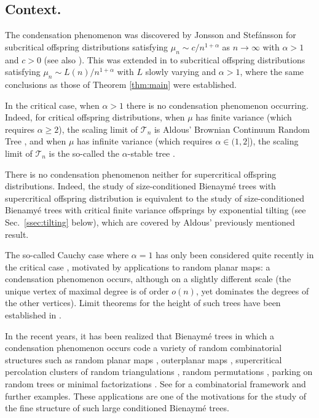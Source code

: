 \documentclass[a4paper,11pt]{article}
\begin{document}
        
        
            \subsection{Context.}
The condensation phenomenon was  discovered by Jonsson and Stefánsson \cite{Jonsson_Stefansson_2011} for subcritical offspring distributions satisfying  $\mu_n \sim c/n^{1+\alpha}$ as $n\rightarrow \infty$ with $\alpha>1$ and $c>0$ (see also \cite[Sec.~19.6]{Jan12}). This was extended  in \cite{Kortchemski_2013} to subcritical offspring distributions satisfying $\mu_{n} \sim L(n)/n^{1+\alpha}$ with $L$ slowly varying and $\alpha>1$, where the same conclusions as those of Theorem \ref{thm:main} were established.

        
 In the critical case, when $\alpha>1$ there is no condensation phenomenon occurring. Indeed, for critical offspring distributions, when $\mu$ has finite variance (which requires $\alpha \geq 2$), the scaling limit of $ \mathcal{T}_{n}$ is Aldous' Brownian Continuum Random Tree \cite{Ald93}, and when $\mu$ has infinite variance (which requires $\alpha \in (1,2]$), the scaling limit of $ \mathcal{T}_{n}$ is the so-called the $\alpha$-stable tree \cite{Duq03}. 
 
 There is no condensation phenomenon neither for supercritical offspring distributions. Indeed, the study of size-conditioned Bienaymé trees with  supercritical offspring distribution is equivalent to the study of size-conditioned Bienamyé trees with critical finite variance offsprings by exponential tilting (see Sec.~\ref{ssec:tilting} below), which are covered by Aldous' previously mentioned  result.
        
        The so-called Cauchy case where $\alpha=1$ has only been considered quite recently in the critical case \cite{Kortchemski_Richier_2018a}, motivated by applications to random planar maps: a condensation phenomenon occurs, although on a slightly different scale (the unique vertex of maximal degree is of order $o(n)$, yet dominates the degrees of the other vertices). Limit theorems for the height of such trees have been established in \cite{addarioberry2023criticaltreesshortfat}.
        
In the recent years, it has been realized that Bienaymé trees in which a condensation phenomenon occurs code a variety of random combinatorial structures such as random planar maps \cite{Add19,JS15,Ric17,AM22,AFS24}, outerplanar maps \cite{SS17}, supercritical percolation clusters of random triangulations \cite{CK15}, random permutations \cite{BBFS20}, parking on random trees \cite{CC23} or minimal factorizations \cite{FK17}. See \cite{Stu16} for a combinatorial  framework and further examples. These applications are one of the motivations for the study of the fine structure of such large conditioned Bienaymé trees.
\end{document}
